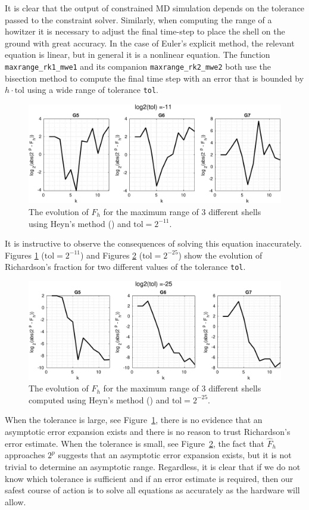 \documentclass[runningheads]{llncs}
\begin{document}
It is clear that the output of constrained MD simulation depends on the tolerance passed to the constraint solver. Similarly, when computing the range of a howitzer it is necessary to adjust the final time-step to place the shell on the ground with great accuracy. In the case of Euler's explicit method, the relevant equation is linear, but in general it is a nonlinear equation. The function {\tt maxrange\_rk1\_mwe1} and its companion {\tt maxrange\_rk2\_mwe2} both use the bisection method to compute the final time step with an error that is bounded by $h\cdot\text{tol}$ using a wide range of tolerance {\tt tol}.
\begin{figure}
  \includegraphics[width=\linewidth]{maxrange_rk2_tol11.pdf} \caption{The evolution of $F_h$ for the maximum range of 3 different shells using Heyn's method () and $\text{tol} = 2^{-11}$.}
  \label{fig:maxrange_rk2_tol11}
\end{figure}
It is instructive to observe the consequences of solving this equation inaccurately. Figures \ref{fig:maxrange_rk2_tol11} ($\text{tol} = 2^{-11}$) and Figures \ref{fig:maxrange_rk2_tol25} ($\text{tol} = 2^{-25}$) show the evolution of Richardson's fraction for two different values of the tolerance {\tt tol}.
\begin{figure}
  \includegraphics[width=\linewidth]{maxrange_rk2_tol25.pdf} \caption{The evolution of $F_h$ for the maximum range of 3 different shells computed using Heyn's method () and $\text{tol} = 2^{-25}$.}
  \label{fig:maxrange_rk2_tol25}
\end{figure}
When the tolerance is large, see Figure~\ref{fig:maxrange_rk2_tol11}, there is no evidence that an asymptotic error expansion exists and there is no reason to trust Richardson's error estimate. When the tolerance is small, see Figure~\ref{fig:maxrange_rk2_tol25}, the fact that $\hat{F}_h$ approaches $2^p$ suggests that an asymptotic error expansion exists, but it is not trivial to determine an asymptotic range. Regardless, it is clear that if we do not know which tolerance is sufficient and if an error estimate is required, then our safest course of action is to solve all equations as accurately as the hardware will allow.
\end{document}
